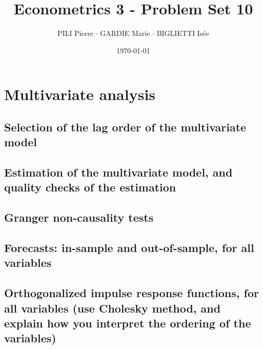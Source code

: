 \documentclass[12pt]{article}
\title{Econometrics 3 - Problem Set 10}
\author{PILI Pierre $\cdot$ GARDIE Marie $\cdot$ BIGLIETTI Isée}
\date{\today}
\begin{document}
\maketitle




\section{Multivariate analysis}
\subsection{Selection of the lag order of the multivariate model}

\subsection{Estimation of the multivariate model, and quality checks of the estimation}

\subsection{Granger non-causality tests}

\subsection{Forecasts: in-sample and out-of-sample, for all variables}

\subsection{Orthogonalized impulse response functions, for all variables (use Cholesky method, and explain how you interpret the ordering of the variables)}
\end{document}
